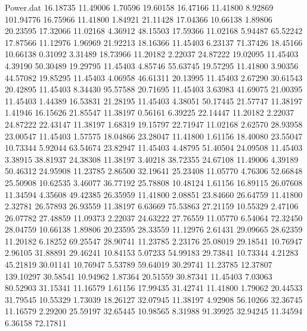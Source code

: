 \begin{filecontents}{Power.dat}
  16.18735   11.49006    1.70596   19.60158
  16.47166   11.41800    8.92869  101.94776
  16.75966   11.41800    1.84921   21.11428
  17.04366   10.66138    1.89806   20.23595
  17.32066   11.02168    4.36912   48.15503
  17.59366   11.02168    5.94487   65.52242
  17.87566   11.12976    1.96969   21.92213
  18.16366   11.45403    6.23137   71.37426
  18.45166   10.66138    0.31092    3.31489
  18.73966   11.20182    2.22037   24.87222
  19.02095   11.45403    4.39190   50.30489
  19.29795   11.45403    4.85746   55.63745
  19.57295   11.41800    3.90356   44.57082
  19.85295   11.45403    4.06958   46.61311
  20.13995   11.45403    2.67290   30.61543
  20.42895   11.45403    8.34430   95.57588
  20.71695   11.45403    3.63983   41.69075
  21.00395   11.45403    1.44389   16.53831
  21.28195   11.45403    4.38051   50.17445
  21.57747   11.38197    1.41946   16.15626
  21.85547   11.38197    0.56161    6.39225
  22.14447   11.20182    2.22037   24.87222
  22.43147   11.38197    1.68319   19.15797
  22.71947   11.02168    2.62570   28.93958
  23.00547   11.45403    1.57575   18.04866
  23.28047   11.41800    1.61156   18.40080
  23.55047   10.73344    5.92044   63.54674
  23.82947   11.45403    4.48795   51.40504
  24.09508   11.45403    3.38915   38.81937
  24.38308   11.38197    3.40218   38.72355
  24.67108   11.49006    4.39189   50.46312
  24.95908   11.23785    2.86500   32.19641
  25.23408   11.05770    4.76306   52.66848
  25.50908   10.62535    3.46077   36.77192
  25.78808   10.48124    1.61156   16.89115
  26.07608   11.34594    4.35608   49.42385
  26.35959   11.41800    2.08851   23.84660
  26.64759   11.41800    2.32781   26.57893
  26.93559   11.38197    6.63669   75.53863
  27.21159   10.55329    2.47106   26.07782
  27.48859   11.09373    2.22037   24.63222
  27.76559   11.05770    6.54064   72.32450
  28.04759   10.66138    1.89806   20.23595
  28.33559   11.12976    2.61431   29.09665
  28.62359   11.20182    6.18252   69.25547
  28.90741   11.23785    2.23176   25.08019
  29.18541   10.76947    2.96105   31.88891
  29.46241   10.84153    5.07233   54.99183
  29.73841   10.73344    4.21283   45.21819
  30.01141   10.76947    5.53789   59.64019
  30.29741   11.23785   12.37807  139.10297
  30.58541   10.94962    1.87364   20.51559
  30.87341   11.45403    7.03063   80.52903
  31.15341   11.16579    1.61156   17.99435
  31.42741   11.41800    1.79062   20.44533
  31.79545   10.55329    1.73039   18.26127
  32.07945   11.38197    4.92908   56.10266
  32.36745   11.16579    2.29200   25.59197
  32.65445   10.98565    8.31988   91.39925
  32.94245   11.34594    6.36158   72.17811

\end{filecontents}
